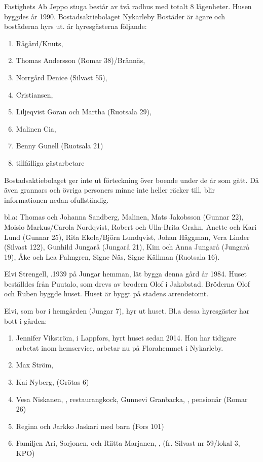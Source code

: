Fastighets Ab Jeppo stuga består av två radhus med totalt 8 lägenheter. Husen byggdes år 1990. Bostadsaktiebolaget Nykarleby Bostäder är ägare och bostäderna hyrs ut.
 är hyresgästerna följande:
\begin{enumerate}
  \item Rågård/Knuts,
  \item Thomas Andersson (Romar 38)/Brännäs,
  \item Norrgård Denice (Silvast 55),
  \item Cristiansen,
  \item Liljeqvist Göran och  Martha (Ruotsala 29),
  \item Malinen Cia,
  \item Benny Gunell (Ruotsala 21)
  \item tillfälliga gästarbetare
\end{enumerate}
Bostadsaktiebolaget ger inte ut förteckning över boende under de år som gått. Då även grannars och övriga personers minne inte heller räcker till, blir informationen nedan ofullständig.

 bl.a: Thomas och Johanna Sandberg, Malinen, Mats Jakobsson (Gunnar 22), Moisio Markus/Carola Nordqvist, Robert och Ulla-Brita Grahn, Anette och Kari Lund (Gunnar 25), Rita Ekola/Björn Lundqvist, Johan Häggman,  Vera Linder (Silvast 122), Gunhild Jungarå (Jungarå 21), Kim och Anna Jungarå (Jungarå 19), Åke och Lea Palmgren, Signe Näs, Signe Källman (Ruotsala 16). \jhvspace{}






Elvi Strengell, .1939 på Jungar hemman, lät bygga denna gård år 1984. Huset beställdes från Puutalo, som drevs av brodern Olof i Jakobstad. Bröderna Olof och Ruben byggde huset. Huset är byggt på stadens arrendetomt.

Elvi, som bor i hemgården (Jungar 7), hyr ut huset. Bl.a dessa hyresgäster har bott i gården:
\begin{enumerate}
  \item Jennifer Vikström,  i Lappfors, hyrt huset sedan 2014. Hon har tidigare arbetat inom hemservice, arbetar nu på Florahemmet i Nykarleby.
  \item Max Ström, 
  \item Kai Nyberg,  (Grötas 6)
  \item Vesa Niskanen, , restaurangkock, Gunnevi Granbacka, , pensionär (Romar 26)
  \item Regina  och Jarkko Jaskari med barn (Fors 101)
  \item Familjen Ari, Sorjonen,  och Riitta Marjanen, , (fr. Silvast nr 59/lokal 3, KPO)
\end{enumerate}



